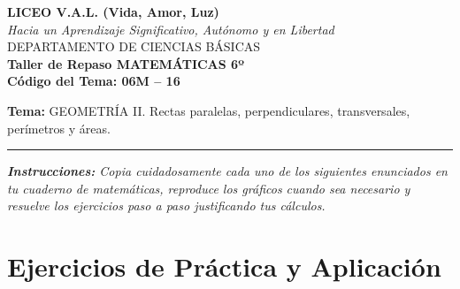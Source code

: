 \documentclass[12pt, letterpaper]{article}
\begin{document}
	\newpage
	\begin{center}
		{\Large \textbf{LICEO V.A.L. (Vida, Amor, Luz)}}\\[0.1cm]
		{\normalsize \textit{Hacia un Aprendizaje Significativo, Autónomo y en Libertad}}\\[0.2cm]
		{\large DEPARTAMENTO DE CIENCIAS BÁSICAS}\\[0.1cm]
		\textbf{Taller de Repaso MATEMÁTICAS 6º}\\[0.1cm]
		\textbf{Código del Tema: 06M – 16}\\[0.1cm]
	\end{center}
	
	\vspace{0.2cm}
	\noindent \textbf{Tema:} GEOMETRÍA II. Rectas paralelas, perpendiculares, transversales, perímetros y áreas.
	\vspace{0.2cm}
	\hrule
	\vspace{0.4cm}
	
	\noindent \textit{\textbf{Instrucciones:} Copia cuidadosamente cada uno de los siguientes enunciados en tu cuaderno de matemáticas, reproduce los gráficos cuando sea necesario y resuelve los ejercicios paso a paso justificando tus cálculos.}
	\vspace{0.4cm}
	
	\section*{Ejercicios de Práctica y Aplicación}
	
\end{document}
